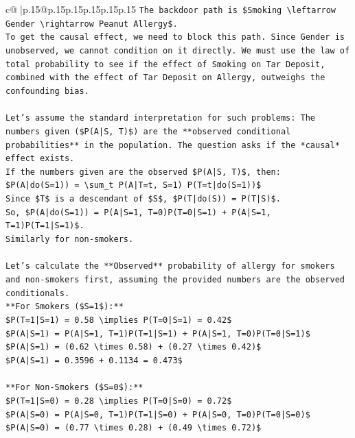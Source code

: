 \documentclass{article}
\begin{document}
{\begin{supertabular}{c@{$\;$}|p{.15\linewidth}@{}p{.15\linewidth}p{.15\linewidth}p{.15\linewidth}p{.15\linewidth}p{.15\linewidth}}
{{{\texttt{The backdoor path is \$Smoking \textbackslash{}leftarrow Gender \textbackslash{}rightarrow Peanut Allergy\$.} \\
\texttt{To get the causal effect, we need to block this path. Since Gender is unobserved, we cannot condition on it directly. We must use the law of total probability to see if the effect of Smoking on Tar Deposit, combined with the effect of Tar Deposit on Allergy, outweighs the confounding bias.} \\
\\ 
\texttt{Let's assume the standard interpretation for such problems: The numbers given (\$P(A|S, T)\$) are the **observed conditional probabilities** in the population. The question asks if the *causal* effect exists.} \\
\texttt{If the numbers given are the observed \$P(A|S, T)\$, then:} \\
\texttt{\$P(A|do(S=1)) = \textbackslash{}sum\_t P(A|T=t, S=1) P(T=t|do(S=1))\$} \\
\texttt{Since \$T\$ is a descendant of \$S\$, \$P(T|do(S)) = P(T|S)\$.} \\
\texttt{So, \$P(A|do(S=1)) = P(A|S=1, T=0)P(T=0|S=1) + P(A|S=1, T=1)P(T=1|S=1)\$.} \\
\texttt{Similarly for non{-}smokers.} \\
\\ 
\texttt{Let's calculate the **Observed** probability of allergy for smokers and non{-}smokers first, assuming the provided numbers are the observed conditionals.} \\
\texttt{**For Smokers (\$S=1\$):**} \\
\texttt{\$P(T=1|S=1) = 0.58 \textbackslash{}implies P(T=0|S=1) = 0.42\$} \\
\texttt{\$P(A|S=1) = P(A|S=1, T=1)P(T=1|S=1) + P(A|S=1, T=0)P(T=0|S=1)\$} \\
\texttt{\$P(A|S=1) = (0.62 \textbackslash{}times 0.58) + (0.27 \textbackslash{}times 0.42)\$} \\
\texttt{\$P(A|S=1) = 0.3596 + 0.1134 = 0.473\$} \\
\\ 
\texttt{**For Non{-}Smokers (\$S=0\$):**} \\
\texttt{\$P(T=1|S=0) = 0.28 \textbackslash{}implies P(T=0|S=0) = 0.72\$} \\
\texttt{\$P(A|S=0) = P(A|S=0, T=1)P(T=1|S=0) + P(A|S=0, T=0)P(T=0|S=0)\$} \\
\texttt{\$P(A|S=0) = (0.77 \textbackslash{}times 0.28) + (0.49 \textbackslash{}times 0.72)\$} \\
}}}
\end{supertabular}}
\end{document}

